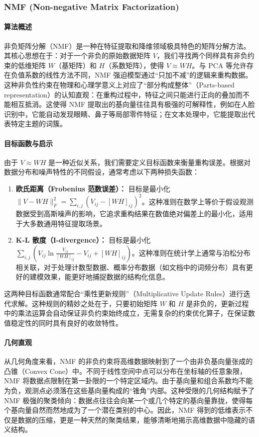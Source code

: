 \subsubsection{NMF (Non-negative Matrix Factorization)}

\paragraph*{算法概述}
非负矩阵分解（NMF）是一种在特征提取和降维领域极具特色的矩阵分解方法。其核心思想在于：对于一个非负的原始数据矩阵 $V$，我们寻找两个同样具有非负约束的低维矩阵 $W$（基矩阵）和 $H$（系数矩阵），使得 $V \approx WH$。与 PCA 等允许存在负值系数的线性方法不同，NMF 强迫模型通过“只加不减”的逻辑来重构数据。这种非负性约束在物理和心理学意义上对应了“部分构成整体”（Parts-based representation）的认知直观：在重构过程中，特征之间只能进行正向的叠加而不能相互抵消。这使得 NMF 提取出的基向量往往具有极强的可解释性，例如在人脸识别中，它能自动发现眼睛、鼻子等局部零件特征；在文本处理中，它能提取出代表特定主题的词簇。

\paragraph*{目标函数与启示}
由于 $V \approx WH$ 是一种近似关系，我们需要定义目标函数来衡量重构误差。根据对数据分布和噪声特性的不同假设，通常考虑以下两种损失函数：
\begin{enumerate}
    \item \textbf{欧氏距离（Frobenius 范数误差）：} 目标是最小化 $\|V - WH\|_F^2 = \sum_{i,j} (V_{ij} - [WH]_{ij})^2$。这种准则在数学上等价于假设观测数据受到高斯噪声的影响，它追求重构结果在数值绝对偏差上的最小化，适用于大多数通用特征提取场景。
    \item \textbf{K-L 散度（I-divergence）：} 目标是最小化 $\sum_{i,j} (V_{ij} \ln \frac{V_{ij}}{[WH]_{ij}} - V_{ij} + [WH]_{ij})$。这种准则在统计学上通常与泊松分布相关联，对于处理计数型数据、概率分布数据（如文档中的词频分布）具有更好的建模效果，能更好地捕捉数据的结构化信息。
\end{enumerate}
这两种目标函数通常配合“乘性更新规则”（Multiplicative Update Rules）进行迭代求解。这种规则的精妙之处在于，只要初始矩阵 $W$ 和 $H$ 是非负的，更新过程中的乘法运算会自动保证非负约束始终成立，无需复杂的约束优化算子，在保证数值稳定性的同时具有良好的收敛特性。

\paragraph*{几何直观}
从几何角度来看，NMF 的非负约束将高维数据映射到了一个由非负基向量张成的凸锥（Convex Cone）中。不同于线性空间中点可以分布在坐标轴的任意象限，NMF 将数据点限制在第一卦限的一个特定区域内。由于基向量和组合系数均不能为负，观测点必须落在这些基向量构成的“锥角”内部。这种受限的几何结构赋予了 NMF 极强的聚类倾向：数据点往往会向某一个或几个特定的基向量靠拢，使得每个基向量自然而然地成为了一个潜在类别的中心。因此，NMF 得到的低维表示不仅是数据的压缩，更是一种天然的聚类结果，能够清晰地揭示高维数据中隐藏的语义结构。

